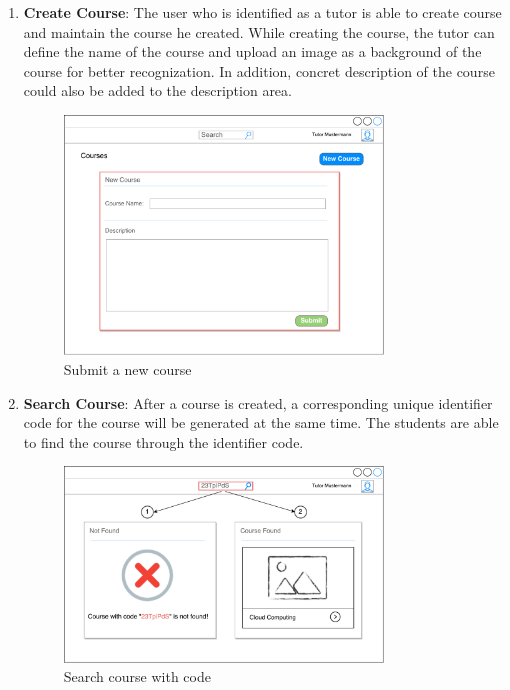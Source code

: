 \begin{enumerate}
\item
\textbf{Create Course}: The user who is identified as a tutor is able to create course and maintain the course he created. While creating the course, the tutor can define the name of the course and upload an image as a background of the course for better recognization. In addition, concret description of the course could also be added to the description area.

\begin{figure}[!htbp]
  \centering
    \includegraphics[width=0.8\textwidth]{Figures/mockup/add-new-course.pdf}
  \caption{Submit a new course}
\end{figure}


\item
\textbf{Search Course}: After a course is created, a corresponding unique identifier code for the course will be generated at the same time. The students are able to find the course through the identifier code.

\begin{figure}[!htbp]
  \centering
    \includegraphics[width=0.8\textwidth]{Figures/mockup/Search-Course.pdf}
  \caption{Search course with code}
\end{figure}


\end{enumerate}

